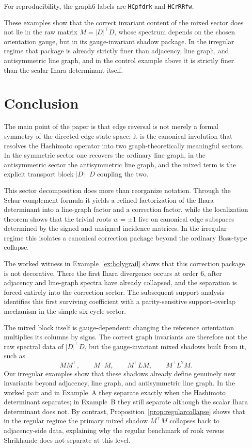 \documentclass[11pt]{article}
\begin{document}
For reproducibility, the graph6 labels are \texttt{HCpfdrk} and \texttt{HCrRRfw}.

\medskip
These examples show that the correct invariant content of the mixed sector does not lie in the raw matrix \(M=|D|^\top D\), whose spectrum depends on the chosen orientation gauge, but in its gauge-invariant shadow package. In the irregular regime that package is already strictly finer than adjacency, line graph, and antisymmetric line graph, and in the control example above it is strictly finer than the scalar Ihara determinant itself.

\section{Conclusion}

The main point of the paper is that edge reversal is not merely a formal symmetry of the directed-edge state space: it is the canonical involution that resolves the Hashimoto operator into two graph-theoretically meaningful sectors. In the symmetric sector one recovers the ordinary line graph, in the antisymmetric sector the antisymmetric line graph, and the mixed term is the explicit transport block $|D|^\top D$ coupling the two.

This sector decomposition does more than reorganize notation. Through the Schur-complement formula it yields a refined factorization of the Ihara determinant into a line-graph factor and a correction factor, while the localization theorem shows that the trivial roots $w=\pm1$ live on canonical edge subspaces determined by the signed and unsigned incidence matrices. In the irregular regime this isolates a canonical correction package beyond the ordinary Bass-type collapse.

The worked witness in Example~\ref{ex:holygrail} shows that this correction package is not decorative. There the first Ihara divergence occurs at order $6$, after adjacency and line-graph spectra have already collapsed, and the separation is forced entirely into the correction sector. The subsequent support analysis identifies this first surviving coefficient with a parity-sensitive support-overlap mechanism in the simple six-cycle sector.

The mixed block itself is gauge-dependent: changing the reference orientation multiplies its columns by signs. The correct graph invariants are therefore not the raw spectral data of $|D|^\top D$, but the gauge-invariant mixed shadows built from it, such as
\[
MM^\top,\qquad M^\top M,\qquad M^\top L M,\qquad M^\top L^2 M.
\]
Our irregular examples show that these shadows already define genuinely new invariants beyond adjacency, line graph, and antisymmetric line graph. In the worked pair and in Example~A they separate exactly when the Hashimoto determinant separates; in Example~B they still separate although the scalar Ihara determinant does not. By contrast, Proposition~\ref{prop:regularcollapse} shows that in the regular regime the primary mixed shadow \(M^\top M\) collapses back to adjacency-side data, explaining why the regular benchmark of rook versus Shrikhande does not separate at this level.
\end{document}
